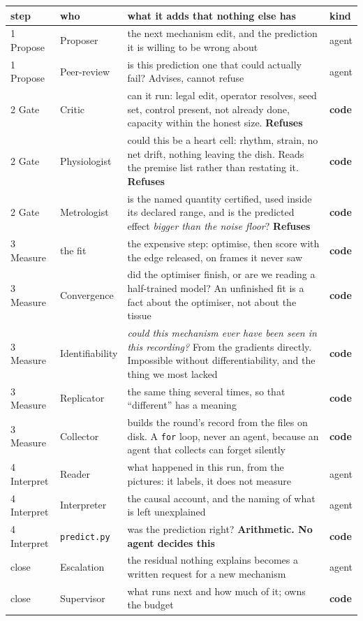 \documentclass[11pt,a4paper]{article}
\newcommand{\code}[1]{\texttt{#1}}
\begin{document}
\begin{center}\small
\begin{tabular}{@{}l l p{7.5cm} l@{}}
\toprule
\textbf{step} & \textbf{who} & \textbf{what it adds that nothing else has} & \textbf{kind}\\
\midrule
1 Propose & Proposer & the next mechanism edit, and the prediction it is willing to be wrong about
& agent\\
1 Propose & Peer-review & is this prediction one that could actually fail? Advises, cannot refuse
& agent\\
\midrule
2 Gate & Critic & can it run: legal edit, operator resolves, seed set, control present, not already
done, capacity within the honest size. \textbf{Refuses} & \textbf{code}\\
2 Gate & Physiologist & could this be a heart cell: rhythm, strain, no net drift, nothing leaving the
dish. Reads the premise list rather than restating it. \textbf{Refuses} & \textbf{code}\\
2 Gate & Metrologist & is the named quantity certified, used inside its declared range, and is the
predicted effect \emph{bigger than the noise floor}? \textbf{Refuses} & \textbf{code}\\
\midrule
3 Measure & the fit & the expensive step: optimise, then score with the edge released, on frames it
never saw & \textbf{code}\\
3 Measure & Convergence & did the optimiser finish, or are we reading a half-trained model? An
unfinished fit is a fact about the optimiser, not about the tissue & \textbf{code}\\
3 Measure & Identifiability & \emph{could this mechanism ever have been seen in this recording?}
From the gradients directly. Impossible without differentiability, and the thing we most lacked
& \textbf{code}\\
3 Measure & Replicator & the same thing several times, so that ``different'' has a meaning
& \textbf{code}\\
3 Measure & Collector & builds the round's record from the files on disk. A \code{for} loop, never
an agent, because an agent that collects can forget silently & \textbf{code}\\
\midrule
4 Interpret & Reader & what happened in this run, from the pictures: it labels, it does not measure
& agent\\
4 Interpret & Interpreter & the causal account, and the naming of what is left unexplained & agent\\
4 Interpret & \code{predict.py} & was the prediction right? \textbf{Arithmetic. No agent decides
this} & \textbf{code}\\
\midrule
close & Escalation & the residual nothing explains becomes a written request for a new mechanism
& agent\\
close & Supervisor & what runs next and how much of it; owns the budget & \textbf{code}\\
\bottomrule
\end{tabular}
\end{center}
\end{document}
